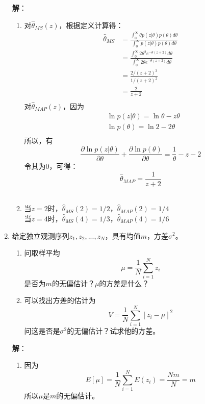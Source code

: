 \documentclass{article}
\begin{document}
\begin{enumerate}[1.]
\textbf{解}：\\
\begin{enumerate}[(1)]
\item
对\({{\hat \theta }_{MS}}(z)\)，根据定义计算得：
\[\begin{aligned}
{{{\hat{\theta }}}_{MS}}
& =\frac{\int_{0}^{\infty }{\theta p(z|\theta )p(\theta )}d\theta }{\int_{0}^{\infty }{p(z|\theta )p(\theta )}d\theta } \\ 
 & =\frac{\int_{0}^{\infty }{2{{\theta }^{2}}{{e}^{-\theta (z+2)}}}d\theta }{\int_{0}^{\infty }{2\theta {{e}^{-\theta (z+2)}}}d\theta } \\ 
 & =\frac{2/(z+2)^3}{1/(z+2)^2}\\ 
 & =\frac{2}{z+2} \\ 
\end{aligned}\]
对\({{\hat \theta }_{MAP}}(z)\)，因为
\[\begin{aligned}
  & \ln p(z|\theta )=\ln \theta -z\theta  \\ 
 & \ln p(\theta )=\ln 2-2\theta  \\ 
\end{aligned}\]
所以，有
\[\frac{\partial \ln p(z|\theta )}{\partial \theta }+\frac{\partial \ln p(\theta )}{\partial \theta }=\frac{1}{\theta }-z-2\]
令其为0，可得：
\[{{{\hat{\theta }}}_{MAP}}=\frac{1}{z+2}\]\\

\item
当$z=2$时，\({{\hat \theta }_{MS}}(2)=1/2\)，\({{\hat \theta }_{MAP}}(2)=1/4\)\\
当$z=4$时，\({{\hat \theta }_{MS}}(4)=1/3\)，\({{\hat \theta }_{MAP}}(4)=1/6\)

\end{enumerate}

\item
给定独立观测序列$z_1,z_2,...,z_N$，具有均值$m$，方差$\sigma ^2$。
\begin{enumerate}[(1)]
\item
问取样平均$$\mu = \frac{1}{N}\sum_{i=1}^N z_i$$是否为$m$的无偏估计？$\mu$的方差是什么？
\item
可以找出方差的估计为$$V=\frac{1}{N}\sum_{i=1}^N[z_i-\mu]^2$$问这是否是$\sigma^2$的无偏估计？试求他的方差。
\end{enumerate}
\textbf{解}：\\
\begin{enumerate}[(1)]
\item
因为$$E[\mu]= \frac{1}{N}\sum_{i=1}^N E(z_i)=\frac{Nm}{N}=m$$
所以$\mu$是$m$的无偏估计。\\


\end{enumerate}
\end{enumerate}
\end{document}
